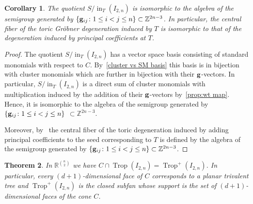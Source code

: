 \documentclass[10pt,a4paper]{amsart}
\newcommand{\thlabel}[1]{\label{#1}}
\newcommand{\thref}[1]{\ref{#1}}
\newtheorem{Theorem}{Theorem}[section]
\newtheorem{Corollary}[Theorem]{Corollary}
\numberwithin{equation}{section}
\DeclareMathOperator{\init}{in}
\DeclareMathOperator{\trop}{Trop}
\begin{document}
\begin{Corollary}\thlabel{cor:central fibre}
The quotient $S/\init_{T}(I_{2,n})$ is isomorphic to the algebra of the semigroup gene\-rated by $\{{\bf g}_{ij}\colon 1\le i<j\le n\}\subset \mathbb Z^{2n-3}$.
In particular, the central fiber of the toric Gr\"obner degeneration induced by $T$ is isomorphic to that of the degeneration induced by principal coefficients at $T$.
\end{Corollary}
\begin{proof}
The quotient $S/\init_{T}(I_{2,n})$ has a vector space basis consisting of standard monomials with respect to $C$. By~\thref{cluster vs SM basis} this basis is in bijection with cluster monomials which are further in bijection with their ${\bf g}$-vectors.
In particular, $S/\init_{T}(I_{2,n})$ is a direct sum of cluster monomials with multiplication induced by the addition of their ${\bf g}$-vectors by~\thref{prop:wt map}.
Hence, it is isomorphic to the algebra of the semigroup generated by $\{{\bf g}_{ij}\colon 1\le i<j\le n\}$ $\subset \mathbb Z^{2n-3}$.

Moreover, by~\cite[Theorem~8.30]{GHKK} the central fiber of the toric degeneration induced by adding principal coefficients to the seed corresponding to $T$ is defined by the algebra of the semigroup generated by $\{{\bf g}_{ij}\colon 1\le i<j\le n\}\subset \mathbb Z^{2n-3}$.
\end{proof}




\begin{Theorem}\thlabel{thm:trop+}
In $\mathbb R^{\binom{n}{2}}$ we have $C\cap \trop(I_{2,n})=\trop^+(I_{2,n})$.
In particular, every $(d+1)$-dimensional face of $C$ corresponds to a planar trivalent tree and $\trop^+(I_{2,n})$ is the closed subfan whose support is the set of $(d+1)$-dimensional faces of the cone $C$.
\end{Theorem}
\end{document}

